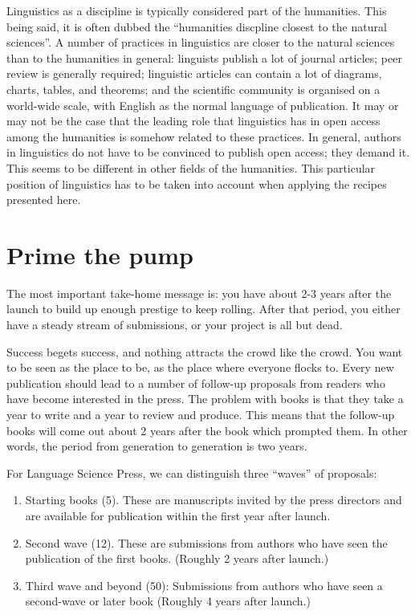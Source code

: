 \documentclass[guidelines,nonflat,modfonts] {langsci/langscibook}
\begin{document}
Linguistics as a discipline is typically considered part of the humanities. This being said, it is often dubbed the ``humanities discpline closest to the natural sciences''. A number of practices in linguistics are closer to the natural sciences than to the humanities in general: linguists publish a lot of journal articles; peer review is generally required; linguistic articles can contain a lot of diagrams, charts, tables, and theorems; and the scientific community is organised on a world-wide scale, with English as the normal language of publication. It may or may not be the case that the leading role that linguistics has in open access among the humanities is somehow related to these practices. In general, authors in linguistics do not have to be convinced to publish open access; they demand it. This seems to be different in other fields of the humanities. This particular position of linguistics has to be taken into account when applying the recipes presented here. 


\chapter{Prime the pump}

The most important take-home message is: you have about 2-3 years after the launch to build up enough prestige to keep rolling. 
After that period, you either have a steady stream of submissions, or your project is all but dead. 

Success begets success, and nothing attracts the crowd like the crowd. You want to be seen as the place to be, as the place where everyone  flocks to. Every new publication should lead to a number of follow-up proposals from readers who have become interested in the press. The problem with books is that they take a year to write and a year to review and produce. This means that the follow-up books will come out about 2 years after the book which prompted them. In other words, the period from generation to generation is two years. 

For Language Science Press, we can distinguish three ``waves'' of proposals: 

\begin{enumerate}
 \item Starting books (5). These are manuscripts invited by the press directors and are available for publication within the first year after launch.
 \item Second wave (12). These are submissions from authors who have seen the publication of the first books. (Roughly 2 years after launch.)
 \item Third wave and beyond (50): Submissions from authors who have seen a second-wave or later book (Roughly 4 years after launch.)
\end{enumerate}
\end{document}
